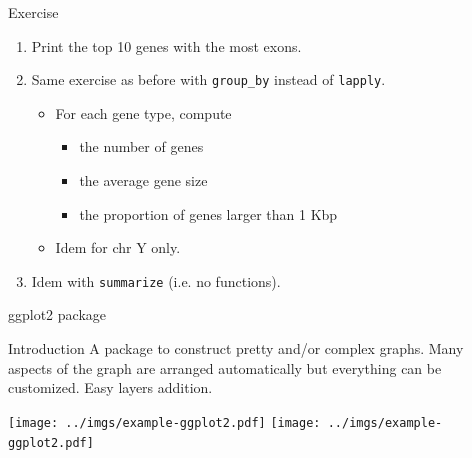 \documentclass[10pt]{beamer}
\begin{document}
\begin{frame}[fragile]{Exercise}
  \begin{enumerate}
  \item Print the top 10 genes with the most exons.
    \bigskip
  \item Same exercise as before with \verb!group_by! instead of \verb!lapply!.
    \begin{itemize}
    \item For each gene type, compute
      \begin{itemize}
      \item the number of genes
      \item the average gene size
      \item the proportion of genes larger than 1 Kbp
      \end{itemize}
    \item Idem for chr Y only.
    \end{itemize}
    \bigskip
  \item Idem with \verb!summarize! (i.e. no functions).
  \end{enumerate}
\end{frame}

\begin{frame}{{\sf ggplot2} package}
  \begin{block}{Introduction}
    A package to construct pretty and/or complex graphs. Many aspects of the graph are arranged automatically but everything can be customized. Easy layers addition.
  \end{block}

  \texttt{[image: ../imgs/example-ggplot2.pdf]}
  \texttt{[image: ../imgs/example-ggplot2.pdf]}

\end{frame}
\end{document}
